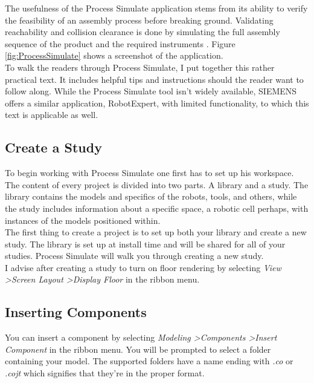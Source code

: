 The usefulness of the Process Simulate application stems from its ability to verify the feasibility of an assembly process before breaking ground. Validating reachability and collision clearance is done by simulating the full assembly sequence of the product and the required instruments \cite{ProcessSimulateProductPage}. Figure \ref{fig:ProcessSimulate} shows a screenshot of the application. \\

To walk the readers through Process Simulate, I put together this rather practical text.
It includes helpful tips and instructions should the reader want to follow along.
While the Process Simulate tool isn't widely available, SIEMENS offers a similar application, RobotExpert, with limited functionality, to which this text is applicable as well. \\

\subsection{Create a Study}
To begin working with Process Simulate one first has to set up his workspace. The content of every project is divided into two parts. A library and a study.
The library contains the models and specifics of the robots, tools, and others, while the study includes information about a specific space, a robotic cell perhaps, with instances of the models positioned within. \\

The first thing to create a project is to set up both your library and create a new study.
The library is set up at install time and will be shared for all of your studies.
Process Simulate will walk you through creating a new study. \\

I advise after creating a study to turn on floor rendering by selecting \emph{View \textgreater Screen Layout \textgreater Display Floor} in the ribbon menu. \\

\subsection{Inserting Components}
You can insert a component by selecting \emph{Modeling \textgreater Components \textgreater Insert Component} in the ribbon menu.
You will be prompted to select a folder containing your model. 
The supported folders have a name ending with \emph{.co} or \emph{.cojt} which signifies that they're in the proper format. \\

